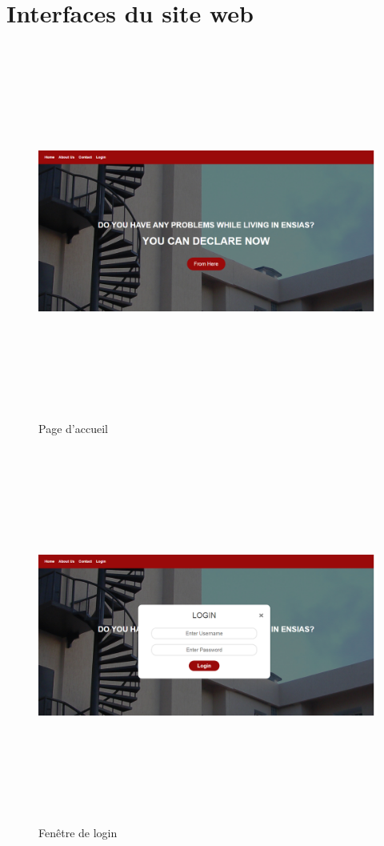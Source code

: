 \documentclass[11.5pt]{report}
\begin{document}
\section{Interfaces du site web}
\begin{figure}[h]
	
	\begin{center}
		\includegraphics[width=500pt,height=350pt]{home.png} 
		\caption{Page d'accueil}
	\end{center}
	
\end{figure}
\newpage
\begin{figure}[h]
	
	\begin{center}
		\includegraphics[width=500pt,height=350pt]{login.png} 
		\caption{Fenêtre de login}
	\end{center}
	
\end{figure}
\end{document}
